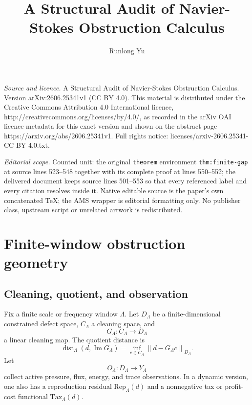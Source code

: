 \documentclass[10pt,a4paper]{amsart}
\numberwithin{equation}{section}
\DeclareMathOperator{\dist}{dist}
\newcommand{\norm}[2]{\left\|#1\right\|_{#2}}
\newcommand{\Tax}{\mathrm{Tax}}
\newcommand{\Rep}{\mathrm{Rep}}
\begin{document}
\title[A Structural Audit of Navier-Stokes Obstruction Calculus]{A Structural Audit of Navier-Stokes Obstruction Calculus}
\author{Runlong Yu}
\date{}
\maketitle
\noindent\emph{Source and licence.} A Structural Audit of Navier-Stokes Obstruction Calculus. Version arXiv:2606.25341v1 (CC BY 4.0). This material is distributed under the Creative Commons Attribution 4.0 International licence, http://creativecommons.org/licenses/by/4.0/, as recorded in the arXiv OAI licence metadata for this exact version and shown on the abstract page https://arxiv.org/abs/2606.25341v1. Full rights notice: licenses/arxiv-2606.25341-CC-BY-4.0.txt.\par\smallskip
\noindent\textit{Editorial scope.} Counted unit: the original \texttt{theorem} environment \texttt{thm:finite-gap} at source lines 523--548 together with its complete proof at lines 550--552; the delivered document keeps source lines 501--553 so that every referenced label and every citation resolves inside it. Native editable source is the paper's own concatenated TeX; the AMS wrapper is editorial formatting only. No publisher class, upstream script or unrelated artwork is redistributed.
\section{Finite-window obstruction geometry}\label{sec:finite-window}

\subsection{Cleaning, quotient, and observation}

Fix a finite scale or frequency window $\Lambda$. Let $D_\Lambda$ be a finite-dimensional constrained defect space, $C_\Lambda$ a cleaning space, and
\[
G_\Lambda:C_\Lambda\to D_\Lambda
\]
a linear cleaning map. The quotient distance is
\begin{equation}\label{eq:quot-distance}
\dist_\Lambda(d,\operatorname{Im}G_\Lambda)
=
\inf_{c\in C_\Lambda}\norm{d-G_\Lambda c}{D_\Lambda}.
\end{equation}
Let
\[
O_\Lambda:D_\Lambda\to Y_\Lambda
\]
collect active pressure, flux, energy, and trace observations. In a dynamic version, one also has a reproduction residual $\Rep_\Lambda(d)$ and a nonnegative tax or profit-cost functional $\Tax_\Lambda(d)$.
\end{document}
